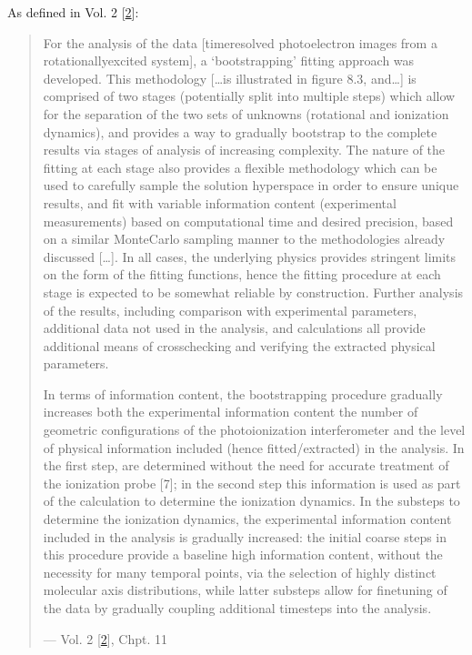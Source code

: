 \documentclass[letterpaper,table,10pt,english]{jupyterBook}
\begin{document}
\sphinxAtStartPar
As defined in  Vol. 2 {[}\hyperlink{cite.backmatter/bibliography:id570}{2}{]}:
\begin{quote}

\sphinxAtStartPar
For the analysis of the data {[}time\sphinxhyphen{}resolved photoelectron images from a rotationally\sphinxhyphen{}excited system{]}, a ‘bootstrapping’ fitting approach was developed. This methodology {[}…is illustrated in figure 8.3, and…{]} is comprised of two stages (potentially split into multiple steps) which allow for the separation of the two sets of unknowns (rotational and ionization dynamics), and provides a way to gradually bootstrap to the complete {\hyperref[\detokenize{backmatter/glossary:term-MF}]{}} results via stages of analysis of increasing complexity. The nature of the fitting at each stage also provides a flexible methodology which can be used to carefully sample the solution hyperspace in order to ensure unique results, and fit with variable information content (experimental measurements) based on computational time and desired precision, based on a similar Monte\sphinxhyphen{}Carlo sampling manner to the methodologies already discussed {[}…{]}. In all cases, the underlying physics provides stringent limits on the form of the fitting functions, hence the fitting procedure at each stage is expected to be somewhat reliable by construction. Further analysis of the results, including comparison with experimental parameters, additional data not used in the analysis, and  calculations all provide additional means of cross\sphinxhyphen{}checking and verifying the extracted physical parameters.

\sphinxAtStartPar
In terms of information content, the bootstrapping procedure gradually increases both the experimental information content \sphinxhyphen{} the number of geometric configurations of the photoionization interferometer \sphinxhyphen{} and the level of physical information included (hence fitted/extracted) in the analysis. In the first step, {\hyperref[\detokenize{backmatter/glossary:term-ADMs}]{}} are determined without the need for accurate treatment of the ionization probe {[}7{]}; in the second step this information is used as part of the calculation to determine the ionization dynamics. In the sub\sphinxhyphen{}steps to determine the ionization dynamics, the experimental information content included in the analysis is gradually increased: the initial coarse steps in this procedure provide a base\sphinxhyphen{}line high information content, without the necessity for many temporal points, via the selection of highly distinct molecular axis distributions, while latter sub\sphinxhyphen{}steps allow for fine\sphinxhyphen{}tuning of the data by gradually coupling additional time\sphinxhyphen{}steps into the analysis.

\begin{flushright}
--- Vol. 2 {[}\hyperlink{cite.backmatter/bibliography:id570}{2}{]}, Chpt. 11
\end{flushright}
\end{quote}
\end{document}
